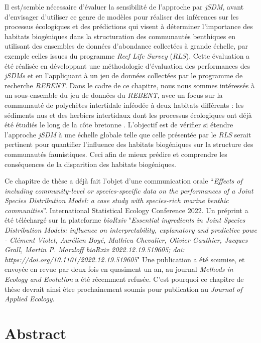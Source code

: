 \begin{refsection}
Il est/semble nécessaire d'évaluer la sensibilité de l'approche par
\emph{jSDM}, avant d'envisager d'utiliser ce genre de modèles pour
réaliser des inférences sur les processus écologiques et des prédictions
qui visent à déterminer l'importance des habitats biogéniques dans la
structuration des communautés benthiques en utilisant des ensembles de
données d'abondance collectées à grande échelle, par exemple celles
issues du programme \emph{Reef Life Survey} (\emph{RLS}). Cette
évaluation a été réalisée en développant une méthodologie d'évaluation
des performances des \emph{jSDMs} et en l'appliquant à un jeu de données
collectées par le programme de recherche \emph{REBENT}. Dans le cadre de
ce chapitre, nous nous sommes intéressés à un sous-ensemble du jeu de
données du \emph{REBENT}, avec un focus sur la communauté de polychètes
intertidale inféodée à deux habitats différents : les sédiments nus et
des herbiers intertidaux dont les processus écologiques ont déjà été
étudiés le long de la côte bretonne \autocites[
]{Boye_2017}{Boye_2019a}. L'objectif est de vérifier si étendre
l'approche \emph{jSDM} à une échelle globale telle que celle présentée
par le \emph{RLS} serait pertinent pour quantifier l'influence des
habitats biogéniques sur la structure des communautés faunistiques. Ceci
afin de mieux prédire et comprendre les conséquences de la disparition
des habitats biogéniques.

Ce chapitre de thèse a déjà fait l'objet d'une communication orale
``\emph{Effects of including community-level or species-specific data on
the performances of a Joint Species Distribution Model: a case study
with species-rich marine benthic communities}''. International
Statistical Ecology Conference 2022. Un préprint a été téléchargé sur la plateforme 
\emph{bioRxiv} "\emph{Essential ingredients in Joint Species Distribution Models: influence on interpretability, explanatory and predictive powe -
Clément Violet, Aurélien Boyé, Mathieu Chevalier, Olivier Gauthier, Jacques Grall, Martin P. Marzloff
bioRxiv 2022.12.19.519605; doi: https://doi.org/10.1101/2022.12.19.519605}"
Une publication a été soumise, et
envoyée en revue par deux fois en quasiment un an, au journal
\emph{Methods in Ecology and Evolution} a été récemment refusée. C'est
pourquoi ce chapitre de thèse devrait ainsi être prochainement soumis
pour publication au \emph{Journal of Applied Ecology}.

\clearpage

\hypertarget{abstract-chapter1}{%
\section{Abstract}\label{abstract-chapter1}}


\end{refsection}
